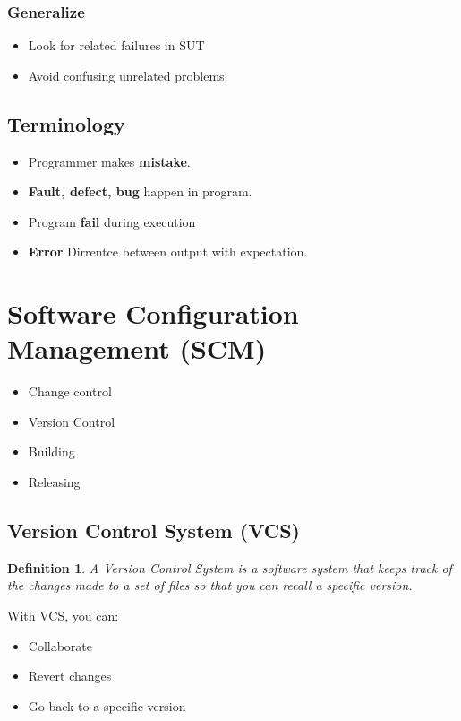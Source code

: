 \documentclass[12pt]{article}
\newtheorem{definition}{Definition}[subsection]
\begin{document}
\subsubsection{Generalize}
    \begin{itemize}
        \item Look for related failures in SUT
        \item Avoid confusing unrelated problems 
    \end{itemize}
\subsection{Terminology}
    \begin{itemize}
        \item Programmer makes \textbf{mistake}.
        \item \textbf{Fault, defect, bug} happen in program.
        \item Program \textbf{fail} during execution
        \item \textbf{Error} Dirrentce between output with expectation.
    \end{itemize}
    
\section{Software Configuration Management (SCM)}
\begin{itemize}
    \item Change control
    \item Version Control
    \item Building
    \item Releasing
\end{itemize}

\subsection{Version Control System (VCS)}
\begin{definition}
    A Version Control System is a software system that keeps track of the changes made to a set of files so that you can recall a specific version.
\end{definition}

    With VCS, you can: 
    \begin{itemize}
        \item Collaborate
        \item Revert changes
        \item Go back to a specific version
    \end{itemize}
\end{document}
